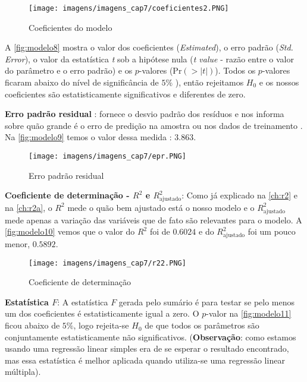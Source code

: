 \begin{figure}[H]
\centering
\caption{Coeficientes do modelo}
\texttt{[image: imagens/imagens\_cap7/coeficientes2.PNG]}
\label{fig:modelo8}
\end{figure}

\noindent A \autoref{fig:modelo8} mostra o valor dos coeficientes (\textit{Estimated}), o erro padrão (\textit{Std. Error}), o valor da estatística \textit{t} sob a hipótese nula (\textit{t value} - razão entre o valor do parâmetro e o erro padrão) e os $p$-valores ($\text{Pr}(>|t|)$). Todos os $p$-valores ficaram abaixo do nível de significância de $5\%$ ), então rejeitamos $H_0$ e os nossos coeficientes são estatisticamente significativos e diferentes de zero.

\newpage

\noindent \textbf{Erro padrão residual} : fornece o desvio padrão dos resíduos e nos informa sobre quão grande é o erro de predição na amostra ou nos dados de treinamento . Na \autoref{fig:modelo9} temos o valor dessa medida : $3.863$.

\begin{figure}[H]
\centering
\caption{Erro padrão residual}
\texttt{[image: imagens/imagens\_cap7/epr.PNG]}
\label{fig:modelo9}
\end{figure}

\noindent \textbf{Coeficiente de determinação - $R^2$ e $R^2_{\text{ajustado}}$}: Como já explicado na \autoref{ch:r2}  e na \autoref{ch:r2a}, o $R^2$ mede o quão bem ajustado está o nosso modelo e o $R^2_{\text{ajustado}}$ mede apenas a variação das variáveis que de fato são relevantes para o modelo. A \autoref{fig:modelo10} vemos que o valor do $R^2$ foi de $0.6024$ e do $R^2_{\text{ajustado}}$ foi um pouco menor, $0.5892$.

\begin{figure}[H]
\centering
\caption{Coeficiente de determinação}
\texttt{[image: imagens/imagens\_cap7/r22.PNG]}
\label{fig:modelo10}
\end{figure}

\noindent \textbf{Estatística $F$}: A estatística $F$ gerada pelo sumário é para testar se pelo menos um dos coeficientes é estatisticamente igual a zero. O $p$-valor na \autoref{fig:modelo11} ficou abaixo de $5\%$, logo rejeita-se $H_0$ de que todos os parâmetros são conjuntamente estatisticamente não significativos. (\textbf{Observação}: como estamos usando uma regressão linear simples era de se esperar o resultado encontrado, mas essa estatística é melhor aplicada quando utiliza-se uma regressão linear múltipla).

